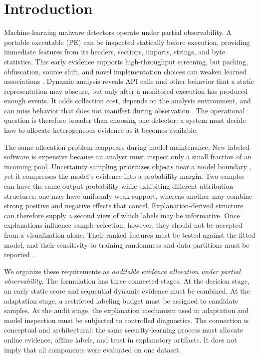 \section{Introduction}
\label{sec:introduction}

Machine-learning malware detectors operate under partial observability. A
portable executable (PE) can be inspected statically before execution, providing
immediate features from its headers, sections, imports, strings, and byte
statistics. This early evidence supports high-throughput screening, but packing,
obfuscation, source shift, and novel implementation choices can weaken learned
associations \cite{ucci2019survey,gibert2020rise,arp2022dos}. Dynamic analysis
reveals API calls and other behavior that a static representation may obscure,
but only after a monitored execution has produced enough events. It adds
collection cost, depends on the analysis environment, and can miss behavior that
does not manifest during observation \cite{sikorski2012practical,
sgandurra2016automated}. The operational question is therefore broader than
choosing one detector: a system must decide how to allocate heterogeneous
evidence as it becomes available.

The same allocation problem reappears during model maintenance. New labeled
software is expensive because an analyst must inspect only a small fraction of
an incoming pool. Uncertainty sampling prioritizes objects near a model boundary
\cite{cohn1996active,settles2009active}, yet it compresses the model's evidence
into a probability margin. Two samples can have the same output probability
while exhibiting different attribution structures: one may have uniformly weak
support, whereas another may combine strong positive and negative effects that
cancel. Explanation-derived structure can therefore supply a second view of
which labels may be informative. Once explanations influence sample selection,
however, they should not be accepted from a visualization alone. Their ranked
features must be tested against the fitted model, and their sensitivity to
training randomness and data partitions must be reported
\cite{warnecke2020evaluating,adebayo2018sanity}.

We organize these requirements as \emph{auditable evidence allocation under
partial observability}. The formulation has three connected stages. At the
decision stage, an early static score and sequential dynamic evidence must be
combined. At the adaptation stage, a restricted labeling budget must be assigned
to candidate samples. At the audit stage, the explanation mechanism used in
adaptation and model inspection must be subjected to controlled diagnostics. The
connection is conceptual and architectural: the same security-learning process
must allocate online evidence, offline labels, and trust in explanatory
artifacts. It does not imply that all components were evaluated on one dataset.

